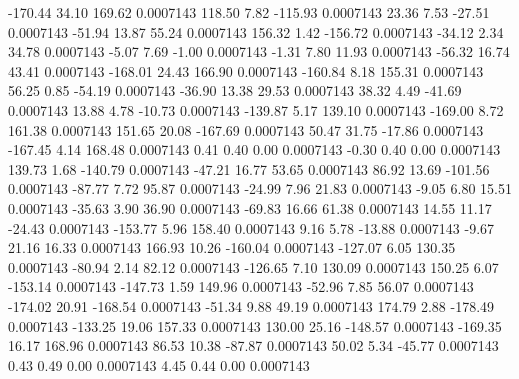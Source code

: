      -170.44       34.10      169.62     0.0007143
      118.50        7.82     -115.93     0.0007143
       23.36        7.53      -27.51     0.0007143
      -51.94       13.87       55.24     0.0007143
      156.32        1.42     -156.72     0.0007143
      -34.12        2.34       34.78     0.0007143
       -5.07        7.69       -1.00     0.0007143
       -1.31        7.80       11.93     0.0007143
      -56.32       16.74       43.41     0.0007143
     -168.01       24.43      166.90     0.0007143
     -160.84        8.18      155.31     0.0007143
       56.25        0.85      -54.19     0.0007143
      -36.90       13.38       29.53     0.0007143
       38.32        4.49      -41.69     0.0007143
       13.88        4.78      -10.73     0.0007143
     -139.87        5.17      139.10     0.0007143
     -169.00        8.72      161.38     0.0007143
      151.65       20.08     -167.69     0.0007143
       50.47       31.75      -17.86     0.0007143
     -167.45        4.14      168.48     0.0007143
        0.41        0.40        0.00     0.0007143
       -0.30        0.40        0.00     0.0007143
      139.73        1.68     -140.79     0.0007143
      -47.21       16.77       53.65     0.0007143
       86.92       13.69     -101.56     0.0007143
      -87.77        7.72       95.87     0.0007143
      -24.99        7.96       21.83     0.0007143
       -9.05        6.80       15.51     0.0007143
      -35.63        3.90       36.90     0.0007143
      -69.83       16.66       61.38     0.0007143
       14.55       11.17      -24.43     0.0007143
     -153.77        5.96      158.40     0.0007143
        9.16        5.78      -13.88     0.0007143
       -9.67       21.16       16.33     0.0007143
      166.93       10.26     -160.04     0.0007143
     -127.07        6.05      130.35     0.0007143
      -80.94        2.14       82.12     0.0007143
     -126.65        7.10      130.09     0.0007143
      150.25        6.07     -153.14     0.0007143
     -147.73        1.59      149.96     0.0007143
      -52.96        7.85       56.07     0.0007143
     -174.02       20.91     -168.54     0.0007143
      -51.34        9.88       49.19     0.0007143
      174.79        2.88     -178.49     0.0007143
     -133.25       19.06      157.33     0.0007143
      130.00       25.16     -148.57     0.0007143
     -169.35       16.17      168.96     0.0007143
       86.53       10.38      -87.87     0.0007143
       50.02        5.34      -45.77     0.0007143
        0.43        0.49        0.00     0.0007143
        4.45        0.44        0.00     0.0007143
